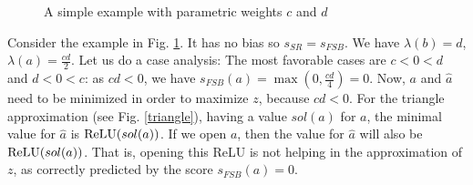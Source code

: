 \begin{figure}[t!]
	\caption{A simple example with parametric weights {\color{red}$c$} and {\color{red}$d$}}
	\label{img:FSB_example}
\end{figure}




Consider the example in Fig. \ref{img:FSB_example}. It has no bias so $s_{SR}=s_{FSB}$.
We have $\lambda(b)=d$, $\lambda(a)=\frac{cd}{2}$.
Let us do a case analysis:
The most favorable cases are $c < 0 < d$ and $d < 0 < c$: 
as $cd <0$, we have $s_{FSB}(a)=\max(0,\frac{cd}{4}) = 0$.
Now, $a$ and $\hat{a}$ need to be minimized in order to maximize $z$, because $cd <0$. 
For the triangle approximation (see Fig. \ref{triangle}), having a value $sol(a)$ for $a$, the minimal value for $\hat{a}$ is $\mathrm{ReLU}(sol(a))$. If we open $a$, then the value for $\hat{a}$ will also be $\mathrm{ReLU}(sol(a))$. That is, opening this ReLU is not helping in the approximation of $z$, as correctly predicted by the score $s_{FSB}(a)= 0$.



